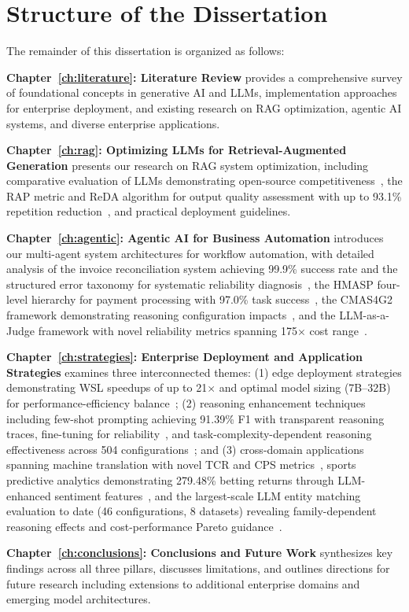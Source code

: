 \section{Structure of the Dissertation}
\label{sec:structure}

The remainder of this dissertation is organized as follows:

\textbf{Chapter~\ref{ch:literature}: Literature Review} provides a comprehensive survey of foundational concepts in generative AI and LLMs, implementation approaches for enterprise deployment, and existing research on RAG optimization, agentic AI systems, and diverse enterprise applications.

\textbf{Chapter~\ref{ch:rag}: Optimizing LLMs for Retrieval-Augmented Generation} presents our research on RAG system optimization, including comparative evaluation of LLMs demonstrating open-source competitiveness~\cite{huang2024orca2rag,huang2024llama2}, the RAP metric and ReDA algorithm for output quality assessment with up to 93.1\% repetition reduction~\cite{huang2025rap}, and practical deployment guidelines.

\textbf{Chapter~\ref{ch:agentic}: Agentic AI for Business Automation} introduces our multi-agent system architectures for workflow automation, with detailed analysis of the invoice reconciliation system achieving 99.9\% success rate and the structured error taxonomy for systematic reliability diagnosis~\cite{huang2025invoice,huang2026when}, the HMASP four-level hierarchy for payment processing with 97.0\% task success~\cite{huang2026hmasp}, the CMAS4G2 framework demonstrating reasoning configuration impacts~\cite{huang2026open}, and the LLM-as-a-Judge framework with novel reliability metrics spanning 175$\times$ cost range~\cite{huang2026judge}.

\textbf{Chapter~\ref{ch:strategies}: Enterprise Deployment and Application Strategies} examines three interconnected themes: (1) edge deployment strategies demonstrating WSL speedups of up to 21$\times$ and optimal model sizing (7B--32B) for performance-efficiency balance~\cite{huang2025edge,huang2025reasoning_deployment}; (2) reasoning enhancement techniques including few-shot prompting achieving 91.39\% F1 with transparent reasoning traces, fine-tuning for reliability~\cite{huang2025deepseek,huang2025logical}, and task-complexity-dependent reasoning effectiveness across 504 configurations~\cite{huang2026complexity}; and (3) cross-domain applications spanning machine translation with novel TCR and CPS metrics~\cite{huang2025translation}, sports predictive analytics demonstrating 279.48\% betting returns through LLM-enhanced sentiment features~\cite{samuel2025soccer}, and the largest-scale LLM entity matching evaluation to date (46 configurations, 8 datasets) revealing family-dependent reasoning effects and cost-performance Pareto guidance~\cite{huang2026entity}.

\textbf{Chapter~\ref{ch:conclusions}: Conclusions and Future Work} synthesizes key findings across all three pillars, discusses limitations, and outlines directions for future research including extensions to additional enterprise domains and emerging model architectures.